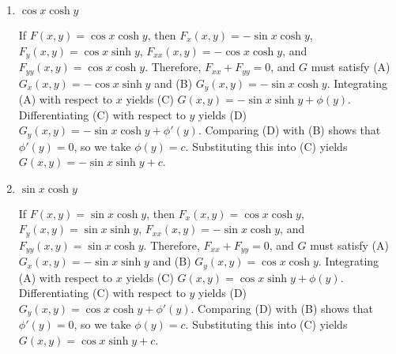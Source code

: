 \documentclass{ximera}
\begin{document}
\begin{problem}
\begin{enumerate}
    \item $\cos x\cosh y$

    

    \begin{solution}
        If $F(x,y)=\cos x\cosh y$, then $F_x(x,y)=-\sin x\cosh y$,
$F_y(x,y)=\cos x\sinh y$,
$F_{xx}(x,y)=-\cos x\cosh y$, and $F_{yy}(x,y)=\cos x\cosh y$.
Therefore, $F_{xx}+F_{yy}=0$, and $G$ must satisfy
(A) $G_x(x,y)=-\cos x\sinh y$ and (B) $G_y(x,y)=-\sin x\cosh y$.
Integrating (A) with respect to $x$ yields
(C) $G(x,y)=-\sin x\sinh y+\phi(y)$.
Differentiating (C) with respect to $y$  yields
(D) $G_y(x,y)=-\sin x\cosh y+\phi'(y)$.
Comparing (D) with (B)  shows that
$\phi'(y)=0$, so we take
$\phi(y)=c$.
Substituting this into (C) yields
$G(x,y)=-\sin x\sinh y+c$.
    \end{solution}
    
    \item $\sin x\cosh y$

    

    \begin{solution}
        If $F(x,y)=\sin x\cosh y$, then $F_x(x,y)=\cos x\cosh y$,
 $F_y(x,y)=\sin x\sinh y$,
$F_{xx}(x,y)=-\sin x\cosh y$, and $F_{yy}(x,y)=\sin x\cosh y$.
Therefore, $F_{xx}+F_{yy}=0$, and $G$ must satisfy
(A) $G_x(x,y)=-\sin x\sinh y$ and (B) $G_y(x,y)=\cos x\cosh y$.
Integrating (A) with respect to $x$ yields
(C) $G(x,y)=\cos x\sinh y+\phi(y)$.
Differentiating (C) with respect to $y$  yields
(D) $G_y(x,y)=\cos x\cosh y+\phi'(y)$.
Comparing (D) with (B)  shows that
$\phi'(y)=0$, so we take
$\phi(y)=c$.
Substituting this into (C) yields
$G(x,y)=\cos x\sinh y+c$.
    \end{solution}
\end{enumerate}
\end{problem}
\end{document}
